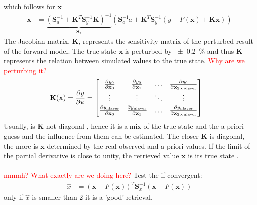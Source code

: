 which follows for $\mathbf{x}$
\begin{align}
	\mathbf{x} & = \underbrace{\left( \mathbf{S}_a^{-1} + \mathbf{K}^T \mathbf{S}_y^{-1} \mathbf{K} \right)^{-1} }_\text{$\mathbf{S}_x$} \left( \mathbf{S}_a^{-1} a + \mathbf{K}^T \mathbf{S}_y^{-1} \left(y - F(\mathbf{x}) + \mathbf{K} \mathbf{x} \right)  \right)
\end{align}
The Jacobian matrix, $\mathbf{K}$, represents the sensitivity matrix of the perturbed result of the forward model. The true state $\mathbf{x}$ is perturbed by \SI{\pm 0.2}{\percent} and thus $\mathbf{K}$ represents the relation between simulated values to the true state.  \textcolor{red}{Why are we perturbing it?}
\begin{align}
	\mathbf{K}(\mathbf{x}) & = \frac{\partial y}{\partial \mathbf{x}} =
	\begin{bmatrix}
		\frac{\partial y_0}{\partial \mathbf{x}_0} & 
		\frac{\partial y_0}{\partial \mathbf{x}_1}  & 
		\ldots & 
		\frac{\partial y_0}{\partial \mathbf{x}_{2\,\text{x\,nlayer}}} \\[0.3em]
		\vdots & \vdots & \ddots & \vdots \\[0.3em]
		\frac{\partial y_{\text{nlayer}}}{\partial \mathbf{x}_0} &
		\frac{\partial y_{\text{nlayer}}}{\partial \mathbf{x}_1} &
		\ldots &
		\frac{\partial y_{\text{nlayer}}}{\partial \mathbf{x}_{2\,\text{x\,nlayer}}}
	\end{bmatrix} %
	\label{eq:Kmatrix}
\end{align}
Usually, is $\mathbf{K}$ not diagonal \citep{wood_estimation_2011}, hence it is a mix of the true state and the a priori guess and the influence from them can be estimated. 
The closer $\mathbf{K}$ is diagonal, the more is $\mathbf{x}$ determined by the real observed and a priori values. If the limit of the partial derivative is close to unity, the retrieved value $\mathbf{x}$ is its true state \citep{wood_estimation_2011}. \\
\\
\textcolor{red}{mmmh? What exactly are we doing here?}
Test the if convergent:
\begin{align}
	\hat{x} & = \left( \mathbf{x} - F(\mathbf{x}) \right)^T \mathbf{S}_x^{-1} \left(\mathbf{x} - F(\mathbf{x}) \right)
\end{align}
only if $\hat{x}$ is smaller than \num{2} it is a 'good' retrieval. 
